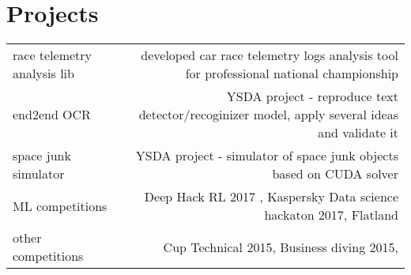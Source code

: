 \section*{Projects}
\vspace{-0.5em}
\begin{tabular}{@{}L!{\VRule}R}
    race telemetry analysis lib & developed car race telemetry logs analysis tool for professional national championship        \\
    end2end OCR                 & YSDA project - reproduce text detector/recoginizer model, apply several ideas and validate it \\
    space junk simulator        & YSDA project - simulator of space junk objects based on CUDA solver                           \\
    ML competitions             & Deep Hack RL 2017 , Kaspersky Data science hackaton 2017, Flatland                            \\
    other competitions          & Cup Technical 2015, Business diving 2015,
\end{tabular}